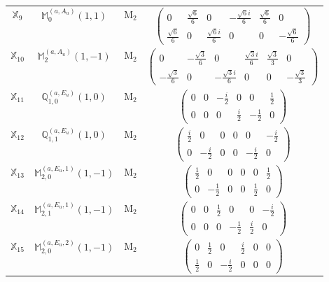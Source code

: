 \documentclass[fleqn,10pt,landscape]{article}
\begin{document}
\begin{itemize}
\begin{center}
\begin{longtable}{c|c|c|c}
$ \mathbb{X}_{9} $ & $\mathbb{M}_{0}^{(a,A_{u})}(1,1)$ & M$_{2}$ & $\begin{pmatrix} 0 & \frac{\sqrt{6}}{6} & 0 & - \frac{\sqrt{6} i}{6} & \frac{\sqrt{6}}{6} & 0 \\ \frac{\sqrt{6}}{6} & 0 & \frac{\sqrt{6} i}{6} & 0 & 0 & - \frac{\sqrt{6}}{6} \end{pmatrix}$ \\
$ \mathbb{X}_{10} $ & $\mathbb{M}_{2}^{(a,A_{u})}(1,-1)$ & M$_{2}$ & $\begin{pmatrix} 0 & - \frac{\sqrt{3}}{6} & 0 & \frac{\sqrt{3} i}{6} & \frac{\sqrt{3}}{3} & 0 \\ - \frac{\sqrt{3}}{6} & 0 & - \frac{\sqrt{3} i}{6} & 0 & 0 & - \frac{\sqrt{3}}{3} \end{pmatrix}$ \\
$ \mathbb{X}_{11} $ & $\mathbb{Q}_{1,0}^{(a,E_{u})}(1,0)$ & M$_{2}$ & $\begin{pmatrix} 0 & 0 & - \frac{i}{2} & 0 & 0 & \frac{1}{2} \\ 0 & 0 & 0 & \frac{i}{2} & - \frac{1}{2} & 0 \end{pmatrix}$ \\
$ \mathbb{X}_{12} $ & $\mathbb{Q}_{1,1}^{(a,E_{u})}(1,0)$ & M$_{2}$ & $\begin{pmatrix} \frac{i}{2} & 0 & 0 & 0 & 0 & - \frac{i}{2} \\ 0 & - \frac{i}{2} & 0 & 0 & - \frac{i}{2} & 0 \end{pmatrix}$ \\
$ \mathbb{X}_{13} $ & $\mathbb{M}_{2,0}^{(a,E_{u},1)}(1,-1)$ & M$_{2}$ & $\begin{pmatrix} \frac{1}{2} & 0 & 0 & 0 & 0 & \frac{1}{2} \\ 0 & - \frac{1}{2} & 0 & 0 & \frac{1}{2} & 0 \end{pmatrix}$ \\
$ \mathbb{X}_{14} $ & $\mathbb{M}_{2,1}^{(a,E_{u},1)}(1,-1)$ & M$_{2}$ & $\begin{pmatrix} 0 & 0 & \frac{1}{2} & 0 & 0 & - \frac{i}{2} \\ 0 & 0 & 0 & - \frac{1}{2} & \frac{i}{2} & 0 \end{pmatrix}$ \\
$ \mathbb{X}_{15} $ & $\mathbb{M}_{2,0}^{(a,E_{u},2)}(1,-1)$ & M$_{2}$ & $\begin{pmatrix} 0 & \frac{1}{2} & 0 & \frac{i}{2} & 0 & 0 \\ \frac{1}{2} & 0 & - \frac{i}{2} & 0 & 0 & 0 \end{pmatrix}$ \\

\end{longtable}
\end{center}
\end{itemize}
\end{document}
